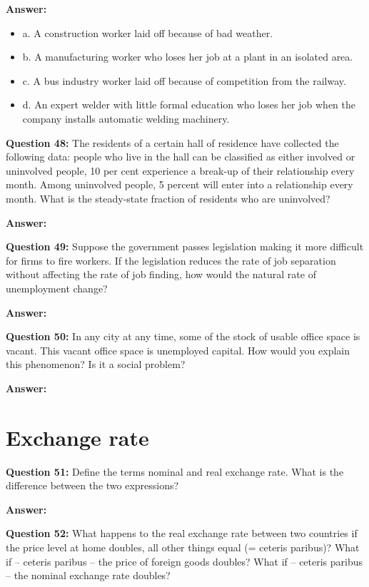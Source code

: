 \documentclass[a4paper, 11pt]{article}
\begin{document}
\textbf{Answer:}
\begin{itemize}
\item a. A construction worker laid off because of bad weather.
\item b. A manufacturing worker who loses her job at a plant in an isolated area.
\item c. A bus industry worker laid off because of competition from the railway.
\item d. An expert welder with little formal education who loses her job when the company installs automatic welding machinery.

\end{itemize}

\textbf{Question 48:} The residents of a certain hall of residence have collected the following data: people who live in the hall can be classified as either involved or uninvolved people, 10 per cent experience a break-up of their relationship every month. Among uninvolved people, 5 percent will enter into a relationship every month. What is the steady-state fraction of residents who are uninvolved?

\textbf{Answer:}

\textbf{Question 49:} Suppose the government passes legislation making it more difficult for firms to fire workers. If the legislation reduces the rate of job separation without affecting the rate of job finding, how would the natural rate of unemployment change?

\textbf{Answer:}

\textbf{Question 50:} In any city at any time, some of the stock of usable office space is vacant. This vacant office space is unemployed capital. How would you explain this phenomenon? Is it a social problem?

\textbf{Answer:}

\section{Exchange rate}

\textbf{Question 51:} Define the terms nominal and real exchange rate. What is the difference between the two expressions?

\textbf{Answer:}

\textbf{Question 52:} What happens to the real exchange rate between two countries if the price level at home doubles, all other things equal (= ceteris paribus)? What if – ceteris paribus – the price of foreign goods doubles? What if – ceteris paribus – the nominal exchange rate doubles?
\end{document}
